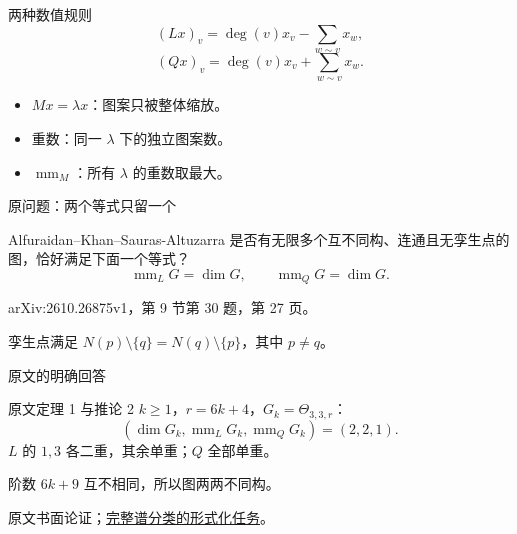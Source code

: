 \documentclass{beamer}
\begin{document}
\begin{frame}{两种数值规则}
\[
(Lx)_v=\deg(v)x_v-\sum_{w\sim v}x_w,
\]
\[
(Qx)_v=\deg(v)x_v+\sum_{w\sim v}x_w.
\]
\begin{itemize}
\item $Mx=\lambda x$：图案只被整体缩放。
\item 重数：同一 $\lambda$ 下的独立图案数。
\item $\operatorname{mm}_M$：所有 $\lambda$ 的重数取最大。
\end{itemize}
\end{frame}
\begin{frame}{原问题：两个等式只留一个}
\begin{block}{Alfuraidan--Khan--Sauras-Altuzarra}
是否有无限多个互不同构、连通且无孪生点的图，恰好满足下面一个等式？
\[
\operatorname{mm}_L G=\dim G,\qquad
\operatorname{mm}_Q G=\dim G.
\]
\end{block}
\small arXiv:2610.26875v1，第 9 节第 30 题，第 27 页。

孪生点满足 $N(p)\setminus\{q\}=N(q)\setminus\{p\}$，其中 $p\ne q$。
\end{frame}
\begin{frame}{原文的明确回答}
\begin{block}{原文定理 1 与推论 2}
$k\geq1$，$r=6k+4$，$G_k=\Theta_{3,3,r}$：
\[
(\dim G_k,\operatorname{mm}_L G_k,\operatorname{mm}_Q G_k)=(2,2,1).
\]
$L$ 的 $1,3$ 各二重，其余单重；$Q$ 全部单重。
\end{block}
阶数 $6k+9$ 互不相同，所以图两两不同构。

\small 原文书面论证；\href{https://github.com/the-omega-institute/trureturing-requests/issues/39}{完整谱分类的形式化任务}。
\end{frame}
\end{document}
